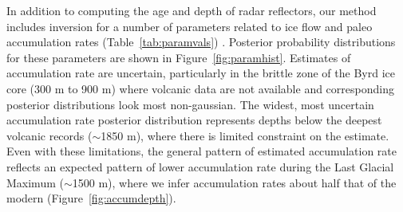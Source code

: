 In addition to computing the age and depth of radar reflectors, our method includes inversion for a number of parameters related to ice flow and paleo accumulation rates (Table~\ref{tab:paramvals}) . Posterior probability distributions for these parameters are shown in Figure~\ref{fig:paramhist}. Estimates of accumulation rate are uncertain, particularly in the brittle zone of the Byrd ice core (300 m to 900 m) where volcanic data are not available and corresponding posterior distributions look most non-gaussian. The widest, most uncertain accumulation rate posterior distribution represents depths below the deepest volcanic records ($\sim$1850 m), where there is limited constraint on the estimate. Even with these limitations, the general pattern of estimated accumulation rate reflects an expected pattern of lower accumulation rate during the Last Glacial Maximum ($\sim$1500 m), where we infer accumulation rates about half that of the modern (Figure~\ref{fig:accumdepth}). 


\begin{figure*}
\centering
{}
\caption{Accumulation rate as a function of ice depth colored by cost value which reflects each solution's fit to data. (Accumulation rate functions associated with lower cost are expected to be better solutions.) Accumulation rate is estimated in 10 depth bins at $\sim$200 m depth intervals. Transitions between these intervals have been smoothed in this figure for ease of viewing.}
\label{fig:accumdepth}
\end{figure*}

